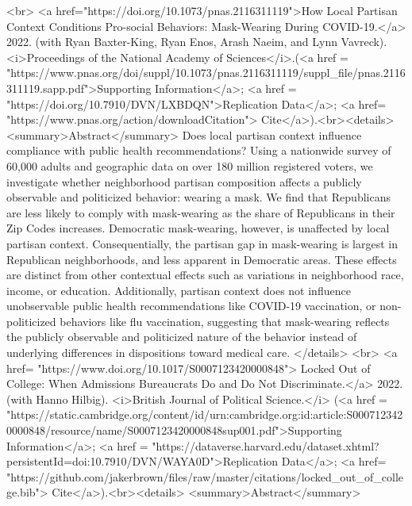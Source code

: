     <br>
    <a href="https://doi.org/10.1073/pnas.2116311119">How Local Partisan Context Conditions Pro-social Behaviors: Mask-Wearing During COVID-19.</a> 2022. (with Ryan Baxter-King, Ryan Enos, Arash Naeim, and Lynn Vavreck). <i>Proceedings of the National Academy of Sciences</i>.(<a href = "https://www.pnas.org/doi/suppl/10.1073/pnas.2116311119/suppl_file/pnas.2116311119.sapp.pdf">Supporting Information</a>; <a href = "https://doi.org/10.7910/DVN/LXBDQN">Replication Data</a>; <a href= "https://www.pnas.org/action/downloadCitation"> Cite</a>).<br><details>
        <summary>Abstract</summary>
        Does local partisan context influence compliance with public health recommendations? Using a nationwide survey of 60,000 adults and geographic data on over 180 million registered voters, we investigate whether neighborhood partisan composition affects a publicly observable and politicized behavior: wearing a mask. We find that Republicans are less likely to comply with mask-wearing as the share of Republicans in their Zip Codes increases. Democratic mask-wearing, however, is unaffected by local partisan context. Consequentially, the partisan gap in mask-wearing is largest in Republican neighborhoods, and less apparent in Democratic areas.  These effects are distinct from other contextual effects such as variations in neighborhood race, income, or education. Additionally, partisan context does not influence unobservable public health recommendations like COVID-19 vaccination, or non-politicized behaviors like flu vaccination, suggesting that mask-wearing reflects the publicly observable and politicized nature of the behavior instead of underlying differences in dispositions toward medical care.
    </details>
    <br>
    <a href= "https://www.doi.org/10.1017/S0007123420000848"> Locked Out of College: When Admissions Bureaucrats Do and Do Not Discriminate.</a> 2022. (with Hanno Hilbig). <i>British Journal of Political Science.</i> (<a href = "https://static.cambridge.org/content/id/urn:cambridge.org:id:article:S0007123420000848/resource/name/S0007123420000848sup001.pdf">Supporting Information</a>; <a href = "https://dataverse.harvard.edu/dataset.xhtml?persistentId=doi:10.7910/DVN/WAYA0D">Replication Data</a>; <a href= "https://github.com/jakerbrown/files/raw/master/citations/locked_out_of_college.bib"> Cite</a>).<br><details>
            <summary>Abstract</summary>
